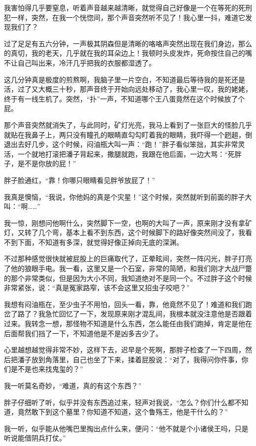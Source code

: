 我害怕得几乎要窒息，听着声音越来越清晰，就觉得自己好像是一个在等死的死刑犯一样，突然，在我一个恍惚间，那个声音突然听不见了！我心里一抖，难道它发现我们了？

过了足足有五六分钟，一声极其阴森但是清晰的咯咯声突然出现在我们身边，那么的真切，我的老天，几乎就在我的耳朵边上！我顿时头皮发炸，死命按住自己的嘴不让自己叫出来，冷汗几乎把我的衣服都湿透了。

这几分钟真是极度的煎熬啊，我脑子里一片空白，不知道最后等待我的是死还是活，过了又大概三十秒，那声音终于开始向远处移动了，我心里一叹，我的姥姥，终于有一线生机了。突然，“扑”一声，不知道哪个王八蛋竟然在这个时候放了个屁。

那个声音突然就消失了，与此同时，矿灯光亮，我马上看到了一张巨大的怪脸几乎就贴在我鼻子上，两只没有瞳孔的眼睛直勾勾盯着我的眼睛，我吓得一个趔趄，倒退出去好几步，这个时候，闷油瓶大叫一声：“跑！”胖子看似笨拙，其实非常灵活，一个就地打滚把潘子背起来，撒腿就跑，我跟在他后面，一边大骂：“死胖子，是不是你放的屁！”

胖子脸通红，“靠！你哪只眼睛看见胖爷放屁了！”

我真是懊恼，“我说，你他妈的真是个灾星！”这个时候，突然就听到前面的胖子大叫：“啊……”

我一惊，刚想问他啊什么，突然脚下一空，也啊的大叫了一声，原来刚才没有拿矿灯，又转了几个弯，基本上看不到东西，这个时候脚下的路好像突然间没了，我看不到下面，不知道有多深，就觉得好像正掉向无底的深渊。

不过那种感觉很快就被屁股上的巨痛取代了，正晕眩间，突然一阵闪光，胖子打亮了他的狼眼手电。我一看，这里又是一个石室，非常的简陋，和我们刚才大战尸蹩的那个非常类似，但是因为大小不同，我知道绝对不是同一个。不过胖子这个时候非常紧张，说：“真是冤家路窄，该不会这里又招虫子咬吧？”

我想有闷油瓶在，至少虫子不用怕，回头一看，靠，他竟然不见了！难道和我们跑岔了路了？我急忙回忆了一下，发现原来刚才混乱间，我根本就没注意他是否跟着过来。我转念一想，那怪物不知道是什么东西，怎么能任由我们跑掉，肯定是他在后面帮我们挡了一下，不知道他是不是凶多吉少了。

心里越想越觉得非常不妙，这样下去，迟早是个死啊，那胖子检查了一下四周，然后把潘子放到角落里，自己也坐了下来，揉着屁股说：“对了，我得问你件事，你们是不是也来找鬼玺的？”

我一听莫名奇妙，“难道，真的有这个东西？”

胖子仔细听了听，似乎并没有东西追过来，轻声对我说，“怎么？你们什么都不知道，竟然敢下到这个墓里？你知道不知道，这个鲁殇王，他是干什么的？”

我一听，似乎能从他嘴巴里掏出点什么来，便问：“他不就是个小诸侯王吗，只是听说能借阴兵打仗。”

